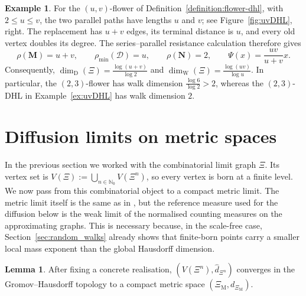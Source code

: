 \documentclass{article}
\theoremstyle{plain}
\theoremstyle{definition}
\newtheorem{lemma}[theorem]{Lemma}
\newtheorem{example}[theorem]{Example}
\newcommand{\dimdeg}{\dim_\mathrm{D}}
\newcommand{\dimwalk}{\dim_\mathrm{W}}
\begin{document}
\begingroup\color{red}
\begin{example}\label{ex:uvFlower}
For the $(u,v)$-flower of Definition~\ref{definition:flower-dhl}, with $2\le u\le v$, the two parallel paths have lengths $u$ and $v$; see Figure~\ref{fig:uvDHL}, right.
The replacement has $u+v$ edges, its terminal distance is $u$, and every old vertex doubles its degree.
The series--parallel resistance calculation therefore gives
\[
\rho(\mathbf M)=u+v,\qquad
\rho_{\min}(\mathcal D)=u,\qquad
\rho(\mathbf N)=2,\qquad
\Psi(x)=\frac{uv}{u+v}x.
\]
Consequently, $\dimdeg(\Xi)=\frac{\log(u+v)}{\log2}$ and $\dimwalk(\Xi)=\frac{\log(uv)}{\log u}$.
In particular, the $(2,3)$-flower has walk dimension $\frac{\log6}{\log2}>2$, whereas the $(2,3)$-DHL in Example~\ref{ex:uvDHL} has walk dimension $2$.
\end{example}
\endgroup





























\section{Diffusion limits on metric spaces}\label{sec:diffusion}

In the previous section we worked with the combinatorial limit graph $\Xi$.
Its vertex set is $V(\Xi):=\bigcup_{n\in\mathbb N_0}V(\Xi^n)$, so every vertex is born at a finite level.
We now pass from this combinatorial object to a compact metric limit.
The metric limit itself is the same as in \cite{neroli2024fractal}, but the reference measure used for the diffusion below is the weak limit of the normalised counting measures on the approximating graphs.
This is necessary because, in the scale-free case, Section~\ref{sec:random_walks} already shows that finite-born points carry a smaller local mass exponent than the global Hausdorff dimension.

\begin{lemma}\label{lem:GH_limit_metric}
After fixing a concrete realisation, $(V(\Xi^n),\hat d_{\Xi^n})$ converges in the Gromov--Hausdorff topology to a compact metric space $(\Xi_{\mathrm M},d_{\Xi_{\mathrm M}})$.
\end{lemma}
\end{document}

